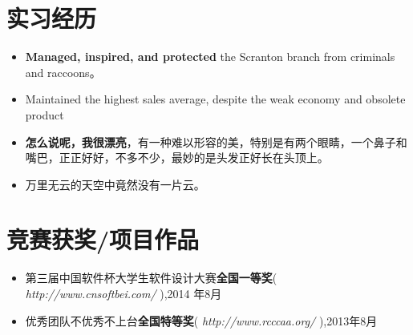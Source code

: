 \documentclass{resume}
\begin{document}

\section{实习经历}
\begin{itemize}
  \item \textbf{Managed, inspired, and protected }the Scranton branch from criminals and raccoons。
  \item Maintained the highest sales average, despite the weak economy and obsolete product
\end{itemize}

\begin{itemize}
  \item \textbf{怎么说呢，我很漂亮}，有一种难以形容的美，特别是有两个眼睛，一个鼻子和嘴巴，正正好好，不多不少，最妙的是头发正好长在头顶上。
  \item 万里无云的天空中竟然没有一片云。
\end{itemize}


\section{竞赛获奖/项目作品}
\begin{itemize}[parsep=0.2ex]
  \item 第三届中国软件杯大学生软件设计大赛\textbf{全国一等奖}( \textit{http://www.cnsoftbei.com/} ),2014 年8月
  \item 优秀团队不优秀不上台\textbf{全国特等奖}( \textit{http://www.rcccaa.org/} ),2013年8月
\end{itemize}

\end{document}
